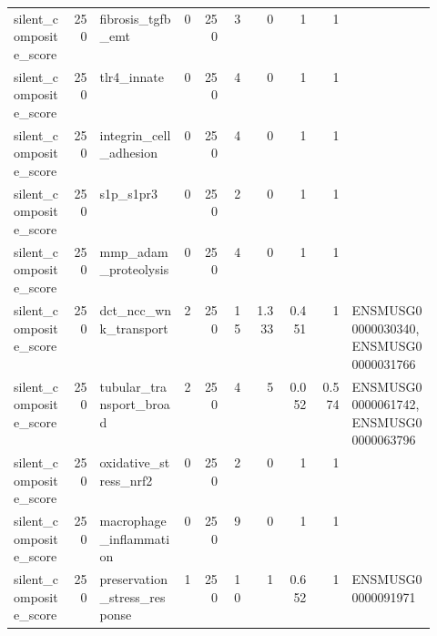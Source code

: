 \documentclass[11pt]{article}
\begin{document}
\begin{landscape}
\begin{longtable}{p{0.14\linewidth}rp{0.20\linewidth}rrrrrrp{0.20\linewidth}}
silent\_composite\_score & 250 & fibrosis\_tgfb\_emt & 0 & 250 & 3 & 0 & 1 & 1 &  \\
silent\_composite\_score & 250 & tlr4\_innate & 0 & 250 & 4 & 0 & 1 & 1 &  \\
silent\_composite\_score & 250 & integrin\_cell\_adhesion & 0 & 250 & 4 & 0 & 1 & 1 &  \\
silent\_composite\_score & 250 & s1p\_s1pr3 & 0 & 250 & 2 & 0 & 1 & 1 &  \\
silent\_composite\_score & 250 & mmp\_adam\_proteolysis & 0 & 250 & 4 & 0 & 1 & 1 &  \\
silent\_composite\_score & 250 & dct\_ncc\_wnk\_transport & 2 & 250 & 15 & 1.333 & 0.451 & 1 & ENSMUSG00000030340,ENSMUSG00000031766 \\
silent\_composite\_score & 250 & tubular\_transport\_broad & 2 & 250 & 4 & 5 & 0.052 & 0.574 & ENSMUSG00000061742,ENSMUSG00000063796 \\
silent\_composite\_score & 250 & oxidative\_stress\_nrf2 & 0 & 250 & 2 & 0 & 1 & 1 &  \\
silent\_composite\_score & 250 & macrophage\_inflammation & 0 & 250 & 9 & 0 & 1 & 1 &  \\
silent\_composite\_score & 250 & preservation\_stress\_response & 1 & 250 & 10 & 1 & 0.652 & 1 & ENSMUSG00000091971 \\
\bottomrule
\end{longtable}
\normalsize
\end{landscape}
\end{document}
